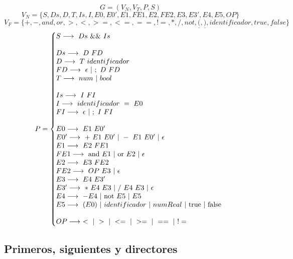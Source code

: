 $$G = (V_N, V_T, P, S)$$
$$V_N = \{S, Ds, D, T, Is, I, E0, E0', E1, FE1, E2, FE2, E3, E3', E4, E5, OP\}$$
$$V_F = \{+, -, and, or, >, <, >=, <=, ==, !=, *, /, not, \underline{(}, \underline{)}, identificador, true, false\}$$
\begin{equation*}P =\left\{
\begin{array}{@{}ll@{}}
S \longrightarrow\ Ds\ \&\&\ Is\\
\\
Ds \longrightarrow\ D\ FD\\
D \longrightarrow\ T\ identificador\\
FD \longrightarrow\ \epsilon\ |\ ;\ D\ FD\\
T \longrightarrow\ num\ |\ bool\\
\\
Is \longrightarrow\ I\ FI\\
I \longrightarrow\ identificador\ =\ E0\\
FI \longrightarrow\ \epsilon\ |\ ;\ I\ FI\\
\\
E0 \longrightarrow\ E1\ E0'\\
E0' \longrightarrow\ +\ E1\ E0'\ |\ -\ E1\ E0'\ |\ \epsilon\\
E1 \longrightarrow\ E2\ FE1\\
FE1 \longrightarrow\ \text{and}\ E1\ |\ \text{or}\ E2\ |\ \epsilon\\
E2 \longrightarrow\ E3\ FE2\\
FE2 \longrightarrow\ OP\ E3\ |\ \epsilon\\
E3 \longrightarrow\ E4\ E3'\\
E3' \longrightarrow\ *\ E4\ E3\ |\ /\ E4\ E3\ |\ \epsilon\\
E4 \longrightarrow\ -E4\ |\ \text{not}\ E5\ |\ E5\\
E5 \longrightarrow\ (E0)\ |\ identificador\ |\ numReal\ |\ \text{true}\ |\ \text{false}\\
\\
OP \longrightarrow\ <\ |\ >\ |\ <=\ |\ >=\ |\ ==\ |\ != \\
\end{array}
\right .
\end{equation*}

\newpage
\subsection{Primeros, siguientes y directores}


